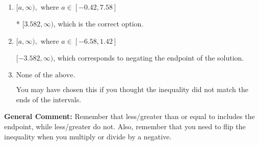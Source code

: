 \documentclass{extbook}[14pt]
\begin{document}
\begin{enumerate}
{\begin{enumerate}[label=\Alph*.]
 $(-\infty, 3.582]$, which corresponds to switching the direction of the interval. You likely did this if you did not flip the inequality when dividing by a negative!
\item \( [a, \infty), \text{ where } a \in [-0.42, 7.58] \)

* $[3.582, \infty)$, which is the correct option.
\item \( [a, \infty), \text{ where } a \in [-6.58, 1.42] \)

 $[-3.582, \infty)$, which corresponds to negating the endpoint of the solution.
\item \( \text{None of the above}. \)

You may have chosen this if you thought the inequality did not match the ends of the intervals.
\end{enumerate}

\textbf{General Comment:} Remember that less/greater than or equal to includes the endpoint, while less/greater do not. Also, remember that you need to flip the inequality when you multiply or divide by a negative.
}
\end{enumerate}
\end{document}
